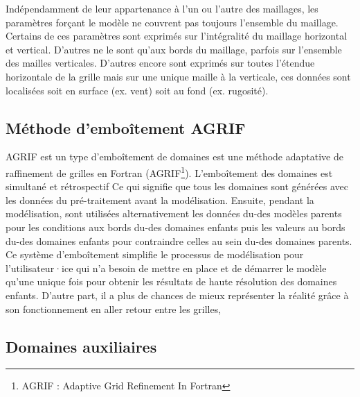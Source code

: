 \documentclass[10pt,a4paper,titlepage]{article}
\begin{document}
Indépendamment de leur appartenance à l'un ou l'autre des maillages, les paramètres forçant le modèle ne couvrent pas toujours l'ensemble du maillage.
Certains de ces paramètres sont exprimés sur l'intégralité du maillage horizontal et vertical.
D'autres ne le sont qu'aux bords du maillage, parfois sur l'ensemble des mailles verticales.
D'autres encore sont exprimés sur toutes l'étendue horizontale de la grille mais sur une unique maille à la verticale, ces données sont localisées soit en surface (ex. vent) soit au fond (ex. rugosité).

\subsection{Méthode d'emboîtement AGRIF}
\label{anx:AGRIF}
AGRIF est un type d'emboîtement de domaines est une méthode adaptative de raffinement de grilles en Fortran (AGRIF\footnote{AGRIF : Adaptive Grid Refinement In Fortran}).
L'emboîtement des domaines est simultané et rétrospectif
Ce qui signifie que tous les domaines sont générées avec les données du pré-traitement avant la modélisation.
Ensuite, pendant la modélisation, sont utilisées alternativement les données du-des modèles parents pour les conditions aux bords du-des domaines enfants puis les valeurs au bords du-des domaines enfants pour contraindre celles au sein du-des domaines parents.
Ce système d'emboîtement simplifie le processus de modélisation pour l'utilisateur·ice qui n'a besoin de mettre en place et de démarrer le modèle qu'une unique fois pour obtenir les résultats de haute résolution des domaines enfants.
D'autre part, il a plus de chances de mieux représenter la réalité grâce à son fonctionnement en aller retour entre les grilles,

\subsection{Domaines auxiliaires}
\end{document}
